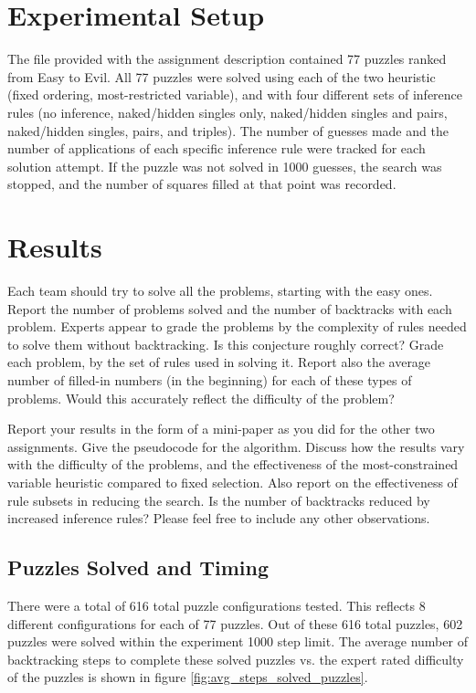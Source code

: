 \documentclass{article}
\begin{document}
\section{Experimental Setup}
The file provided with the assignment description contained 77 puzzles ranked from Easy to Evil. All 77 puzzles were solved using each of the two heuristic (fixed ordering, most-restricted variable), and with four different sets of inference rules (no inference, naked/hidden singles only, naked/hidden singles and pairs, naked/hidden singles, pairs, and triples). The number of guesses made and the number of applications of each specific inference rule were tracked for each solution attempt. If the puzzle was not solved in 1000 guesses, the search was stopped, and the number of squares filled at that point was recorded.

\section{Results}
Each team should try to solve all the problems, starting with the easy ones. Report the number of problems solved and the number of backtracks with each problem. Experts appear to grade the problems by the complexity of rules needed to solve them without backtracking. Is this conjecture roughly correct? Grade each problem, by the set of rules used in solving it. Report also the average number of filled-in numbers (in the beginning) for each of these types of problems. Would this accurately reflect the difficulty of the problem?

Report your results in the form of a mini-paper as you did for the other two assignments. Give the pseudocode for the algorithm. Discuss how the results vary with the difficulty of the problems, and the effectiveness of the most-constrained variable heuristic compared to fixed selection. Also report on the effectiveness of rule subsets in reducing the search. Is the number of backtracks reduced by increased inference rules? Please feel free to include any other observations.

\subsection{Puzzles Solved and Timing}
There were a total of 616 total puzzle configurations tested. This reflects 8 different configurations for each of 77 puzzles. Out of these 616 total puzzles, 602 puzzles were solved within the experiment 1000 step limit. The average number of backtracking steps to complete these solved puzzles vs. the expert rated difficulty of the puzzles is shown in figure \ref{fig:avg_steps_solved_puzzles}.
\end{document}
